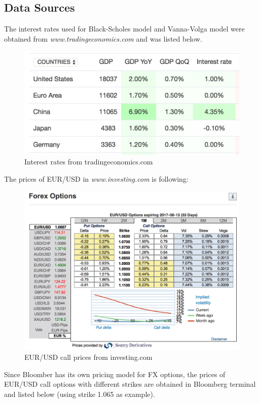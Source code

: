 \appendix
\chapter{}
\section{Data Sources}
The interest rates used for Black-Scholes model and Vanna-Volga model were obtained from \textit{www.tradingeconomics.com} and was listed below.
\begin{figure}[tbph]
	\centering
	\includegraphics[width=0.6\linewidth]{"Testing-data/Interest rate - Trading economics"}
	\caption{Interest rates from tradingeconomics.com}
	\label{fig:interest-rate---trading-economics}
\end{figure}
\newline
The prices of EUR/USD in \textit{www.investing.com} is following:
\begin{figure}[tbph]
	\centering
	\includegraphics[scale=0.3]{./Testing-data/EURUSD_1M_investing.png} 
	\caption{EUR/USD call prices from investing.com}
	\label{fig:prices-investing.com} %
\end{figure}
\newline
Since Bloomber has its own pricing model for FX options, the prices of EUR/USD call options with different strikes are obtained in Bloomberg terminal and listed below (using strike 1.065 as example).

